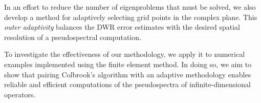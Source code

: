 




In an effort to reduce the number of eigenproblems that must be solved, we also develop a method for adaptively selecting grid points in the complex plane. This \textit{outer adaptivity} balances the DWR error estimates with the desired spatial resolution of a pseudospectral computation. 

To investigate the effectiveness of our methodology, we apply it to numerical examples implemented using the finite element method. In doing so, we aim to show that pairing Colbrook's algorithm with an adaptive methodology enables reliable and efficient computations of the pseudospectra of infinite-dimensional operators.


